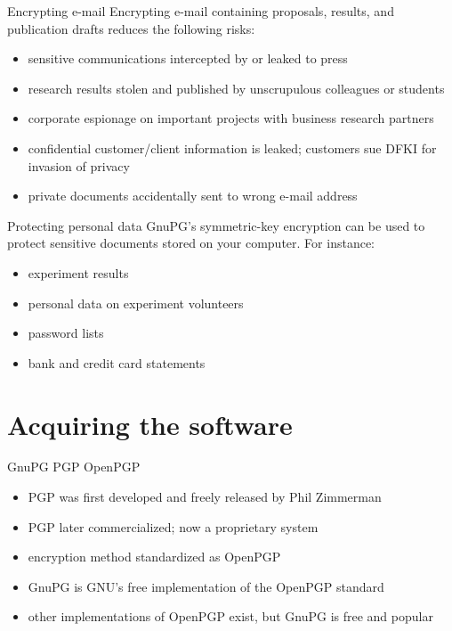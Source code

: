 \documentclass[%
mode=present,%
paper=smartboard,
size=20pt,
]{powerdot}
\begin{document}
\begin{slide}{Encrypting e-mail}
  Encrypting e-mail containing proposals, results, and publication
  drafts reduces the following risks:\\[1ex]
  \begin{itemize}
  \item sensitive communications intercepted by or leaked to press
  \item research results stolen and published by unscrupulous
    colleagues or students
  \item corporate espionage on important projects with business
    research partners
  \item confidential customer/client information is leaked; customers
    sue DFKI for invasion of privacy
  \item private documents accidentally sent to wrong e-mail address
  \end{itemize}
\end{slide}

\begin{slide}{Protecting personal data}
  GnuPG's symmetric-key encryption can be used to protect sensitive
  documents stored on your computer.  For instance:\\[1ex]
  \begin{itemize}
  \item experiment results
  \item personal data on experiment volunteers
  \item password lists
  \item bank and credit card statements
  \end{itemize}
\end{slide}


\section{Acquiring the software}

\begin{slide}{GnuPG \vs PGP \vs OpenPGP}
  \begin{itemize}
  \item PGP was first developed and freely released by Phil Zimmerman
  \item PGP later commercialized; now a proprietary system
  \item encryption method standardized as OpenPGP
  \item GnuPG is GNU's free implementation of the OpenPGP standard
  \item other implementations of OpenPGP exist, but GnuPG is free and
    popular
  \end{itemize}
\end{slide}
\end{document}
